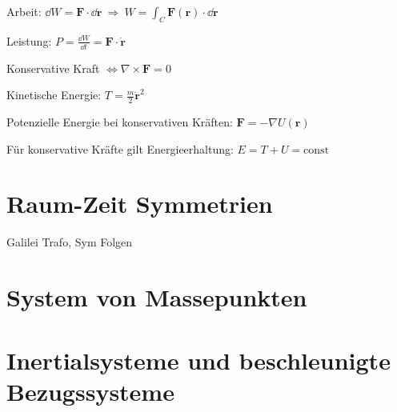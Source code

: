 \begin{frameddefn}[Energieerhaltung]
	Arbeit: $\dd W = \mathbf{F} \cdot \dd \mathbf{r} \ \Rightarrow \ W = \int_C \mathbf{F(r)} \cdot \dd \mathbf{r}$
	
	Leistung: $ P = \frac{\dd W}{ \dd t} = \mathbf{F} \cdot \mathbf{\dot r}$
	
	Konservative Kraft $ \iff \nabla \times \mathbf{F} = 0$
	
	Kinetische Energie: $T = \frac{m}{2} \mathbf{\dot r}^2$
	
	Potenzielle Energie bei konservativen Kräften: $\mathbf{F} = - \nabla U(\mathbf{r})$
	
	Für konservative Kräfte gilt Energieerhaltung: $E = T + U = \textrm{const}$
\end{frameddefn}


\section{Raum-Zeit Symmetrien}
Galilei Trafo, Sym Folgen

\section{System von Massepunkten}

\section{Inertialsysteme und beschleunigte Bezugssysteme}

